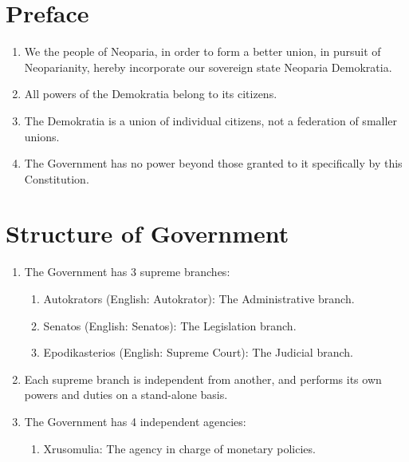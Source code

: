 



\section{Preface}
\begin{enumerate}
	\item We the people of Neoparia, in order to form a better union, in pursuit of Neoparianity, hereby incorporate our sovereign state Neoparia Demokratia.
	\item All powers of the Demokratia belong to its citizens.
	\item The Demokratia is a union of individual citizens, not a federation of smaller unions.
	\item The Government has no power beyond those granted to it specifically by this Constitution.
\end{enumerate}

\section{Structure of Government}
\begin{enumerate}[start=101]
	\item The Government has 3 supreme branches:
	      \begin{enumerate}
		      \item Autokrators (English: Autokrator): The Administrative branch.
		      \item Senatos (English: Senatos): The Legislation branch.
		      \item Epodikasterios (English: Supreme Court): The Judicial branch.
	      \end{enumerate}
	\item Each supreme branch is independent from another, and performs its own powers and duties on a stand-alone basis.
	\item The Government has 4 independent agencies:
	      \begin{enumerate}
		      \item Xrusomulia: The agency in charge of monetary policies.
	      \end{enumerate}
\end{enumerate}







